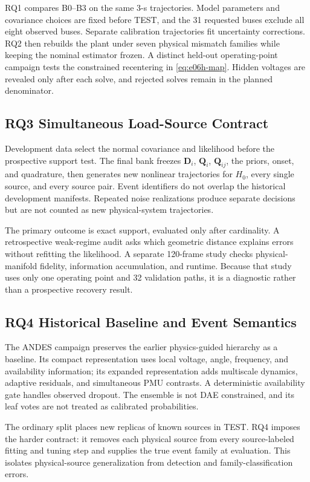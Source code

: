 RQ1 compares B0--B3 on the same 3-s trajectories. Model parameters and covariance choices are fixed before TEST, and the 31 requested buses exclude all eight observed buses. Separate calibration trajectories fit uncertainty corrections. RQ2 then rebuilds the plant under seven physical mismatch families while keeping the nominal estimator frozen. A distinct held-out operating-point campaign tests the constrained recentering in \eqref{eq:e06h-map}. Hidden voltages are revealed only after each solve, and rejected solves remain in the planned denominator.

\subsection{RQ3 Simultaneous Load-Source Contract}

Development data select the normal covariance and likelihood before the prospective support test. The final bank freezes $\bm D_i$, $\bm Q_i$, $\bm Q_{ij}$, the priors, onset, and quadrature, then generates new nonlinear trajectories for $H_0$, every single source, and every source pair. Event identifiers do not overlap the historical development manifests. Repeated noise realizations produce separate decisions but are not counted as new physical-system trajectories.

The primary outcome is exact support, evaluated only after cardinality. A retrospective weak-regime audit asks which geometric distance explains errors without refitting the likelihood. A separate 120-frame study checks physical-manifold fidelity, information accumulation, and runtime. Because that study uses only one operating point and 32 validation paths, it is a diagnostic rather than a prospective recovery result.

\subsection{RQ4 Historical Baseline and Event Semantics}

The ANDES campaign \cite{cui2021hybrid} preserves the earlier physics-guided hierarchy as a baseline. Its compact representation uses local voltage, angle, frequency, and availability information; its expanded representation adds multiscale dynamics, adaptive residuals, and simultaneous PMU contrasts. A deterministic availability gate handles observed dropout. The ensemble is not DAE constrained, and its leaf votes are not treated as calibrated probabilities.

The ordinary split places new replicas of known sources in TEST. RQ4 imposes the harder contract: it removes each physical source from every source-labeled fitting and tuning step and supplies the true event family at evaluation. This isolates physical-source generalization from detection and family-classification errors.

